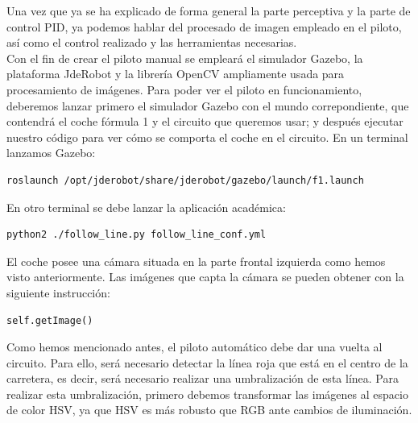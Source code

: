 Una vez que ya se ha explicado de forma general la parte perceptiva y la parte de control PID, ya podemos hablar del procesado de imagen empleado en el piloto, así como el control realizado y las herramientas necesarias.\\

Con el fin de crear el piloto manual se empleará el simulador Gazebo, la plataforma JdeRobot y la librería OpenCV ampliamente usada para procesamiento de imágenes. Para poder ver el piloto en funcionamiento, deberemos lanzar primero el simulador Gazebo con el mundo correpondiente, que contendrá el coche fórmula 1 y el circuito que queremos usar; y después ejecutar nuestro código para ver cómo se comporta el coche en el circuito. En un terminal lanzamos Gazebo:\\

\vspace{10pt}
\begin{lstlisting}
roslaunch /opt/jderobot/share/jderobot/gazebo/launch/f1.launch
\end{lstlisting}
\vspace{20pt}


En otro terminal se debe lanzar la aplicación académica:

\vspace{10pt}
\begin{lstlisting}
python2 ./follow_line.py follow_line_conf.yml
\end{lstlisting}
\vspace{20pt}


El coche posee una cámara situada en la parte frontal izquierda como hemos visto anteriormente. Las imágenes que capta la cámara se pueden obtener con la siguiente instrucción:\\

\vspace{10pt}
\begin{lstlisting}
self.getImage()
\end{lstlisting}
\vspace{20pt}

Como hemos mencionado antes, el piloto automático debe dar una vuelta al circuito. Para ello, será necesario detectar la línea roja que está en el centro de la carretera, es decir, será necesario realizar una umbralización de esta línea. Para realizar esta umbralización, primero debemos transformar las imágenes al espacio de color HSV, ya que HSV es más robusto que RGB ante cambios de iluminación. \\

